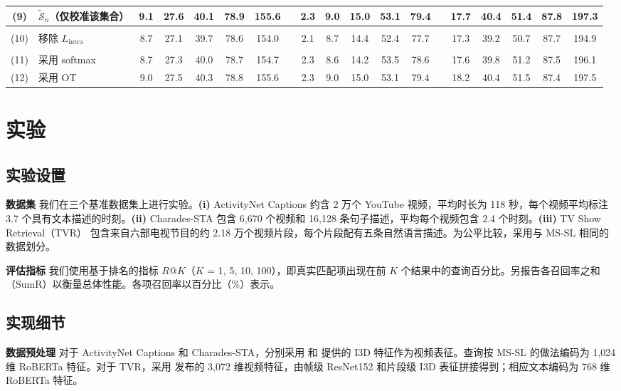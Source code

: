 \begin{table}[t]
{\begin{tabular}{cl ccccc c ccccc c  ccccc}
(9) & $\mathcal{\tilde{S}}_n$（仅校准该集合） &  9.1 & 27.6 & 40.1 & 78.9 & 155.6  &&2.3 & 9.0 & 15.0 & 53.1  & 79.4 &&17.7 & 40.4 & 51.4 & 87.8  & 197.3\\ 
\midrule
\rowcolor{basegray}
\multicolumn{19}{l}{\scalebox{1.1}{\textit{视频内证据学习的有效性}}}\\
(10) & 移除 $L_{\mathrm{intra}}$ 
& 8.7 & 27.1 & 39.7 & 78.6 & 154.0&&2.1 & 8.7 & 14.4 & 52.4 & 77.7 & & 17.3 & 39.2& 50.7 & 87.7  & 194.9\\
\midrule
\rowcolor{basegray}
\multicolumn{19}{l}{\scalebox{1.1}{\textit{灵活最优传输的有效性}}}\\
(11) & 采用 softmax & 8.7 & 27.3 & 40.0 & 78.7 & 154.7  &&2.3 & 8.6 & 14.2 & 53.5  & 78.6 & & 17.6 & 39.8& 51.2 & 87.5  & 196.1\\
(12) &采用 OT&  9.0 & 27.5 & 40.3 & 78.8 & 155.6  &&2.3 & 9.0 & 15.0 & 53.1  & 79.4 &&18.2 & 40.4 & 51.5 & 87.4  & 197.5\\ 
\hline
\bottomrule
\end{tabular}
}
 \label{tab:ablation}
\end{table}
\section{实验} \label{sec:experiments}
\subsection{实验设置} \label{subsec:exp_setup}
\noindent \textbf{数据集} \quad 我们在三个基准数据集上进行实验。\textbf{(i)} ActivityNet Captions\cite{krishna2017dense} 约含 2 万个 YouTube 视频，平均时长为 118 秒，每个视频平均标注 3.7 个具有文本描述的时刻。\textbf{(ii)} Charades-STA\cite{gao2017tall} 包含 6,670 个视频和 16,128 条句子描述，平均每个视频包含 2.4 个时刻。\textbf{(iii)} TV Show Retrieval（TVR）\cite{lei2020tvr} 包含来自六部电视节目的约 2.18 万个视频片段，每个片段配有五条自然语言描述。为公平比较，采用与 MS-SL\cite{ms-sl} 相同的数据划分。

\noindent \textbf{评估指标} \quad 我们使用基于排名的指标 $R$@$K$（$K$ = 1, 5, 10, 100），即真实匹配项出现在前 $K$ 个结果中的查询百分比。另报告各召回率之和（SumR）以衡量总体性能。各项召回率以百分比（$\%$）表示。

\subsection{实现细节}
\noindent \textbf{数据预处理} \quad 对于 ActivityNet Captions 和 Charades-STA，分别采用\citet{zhang2020hierarchical} 和\citet{mun2020local} 提供的 I3D 特征作为视频表征。查询按 MS-SL\cite{ms-sl} 的做法编码为 1,024 维 RoBERTa 特征。对于 TVR，采用\citet{lei2020tvr} 发布的 3,072 维视频特征，由帧级 ResNet152\cite{he2016deep} 和片段级 I3D\cite{carreira2017quo} 表征拼接得到；相应文本编码为 768 维 RoBERTa 特征\cite{liu2019roberta}。

